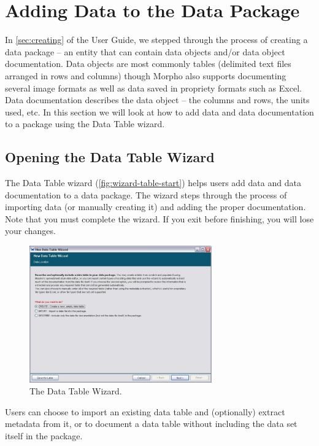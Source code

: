 \section{Adding Data to the Data Package} \label{sec:adding-data}

In \autoref{sec:creating} of the User Guide, we stepped through the
process of creating a data package -- an entity that can contain data
objects and/or data object documentation. Data objects are most commonly
tables (delimited text files arranged in rows and columns) though Morpho
also supports documenting several image formats as well as data saved in
propriety formats such as Excel. Data documentation describes the data
object -- the columns and rows, the units used, etc. In this section we
will look at how to add data and data documentation to a package using
the Data Table wizard.

\subsection{Opening the Data Table Wizard} \label{sec:wizard-newtable}

The Data Table wizard (\autoref{fig:wizard-table-start}) helps users add
data and data documentation to a data package. The wizard steps through
the process of importing data (or manually creating it) and adding the
proper documentation. Note that you must complete the wizard. If you
exit before finishing, you will lose your changes.

\begin{figure}
  \centering
    \includegraphics[width=0.7\textwidth]{images/wizard-table-start.jpg}
  \caption{The Data Table Wizard.}
  \label{fig:wizard-table-start}
\end{figure}

Users can choose to import an existing data table and
(optionally) extract metadata from it, or to document a data table
without including the data set itself in the package.

